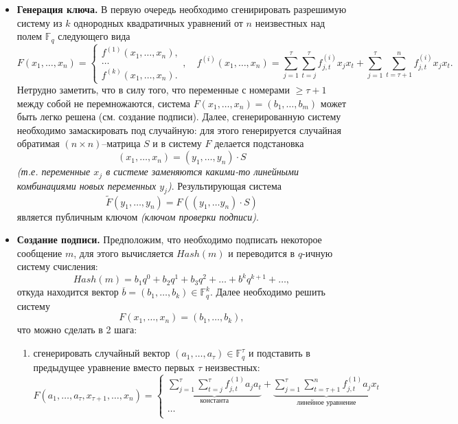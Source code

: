 \documentclass[12pt,letterpaper]{article}
\newcommand{\FF}{\mathds{F}}
\begin{document}
\begin{itemize}
  \item \textbf{Генерация ключа.} В первую очередь необходимо сгенирировать разрешимую систему из $k$ однородных квадратичных уравнений от $n$ неизвестных над полем $\FF_q$ следующего вида
  \[
    F(x_1, \dots, x_n) = \begin{cases}
      f^{(1)}(x_1, \dots, x_n), \\
      \dots \\
      f^{(k)}(x_1, \dots, x_n). 
    \end{cases}, \quad
    f^{(i)}(x_1, \dots, x_n) = \sum_{j = 1}^\tau \sum_{t = j}^\tau f^{(i)}_{j,t} x_j x_t + \sum_{j = 1}^\tau \sum_{t = \tau+1}^n f^{(i)}_{j,t} x_j x_t.
  \]
  Нетрудно заметить, что в силу того, что переменные с номерами $\geq \tau+1$ между собой не перемножаются, система $F(x_1, \dots, x_n) = (b_1, \dots, b_m)$ может быть  легко решена (см. создание подписи). Далее, сгенерированную систему необходимо замаскировать под случайную: для этого генерируется случайная обратимая $(n \times n)$--матрица $S$ и в систему $F$ делается подстановка
  \[ (x_1, \dots, x_n) = (y_1, \dots, y_n) \cdot S \]
  \emph{(т.е. переменные $x_j$ в системе заменяются какими-то линейными комбинациями новых переменных $y_j$)}. Результирующая система 
  \[ \tilde{F}(y_1, \dots, y_n) = F\left( (y_1, \dots y_n) \cdot S \right) \]
  является публичным ключом \emph{(ключом проверки подписи)}.
  \item \textbf{Создание подписи.} Предположим, что необходимо подписать некоторое сообщение $m$, для этого вычисляется $Hash(m)$ и переводится в $q$-ичную систему счисления:
  \[ Hash(m) = b_1 q^0 + b_2 q^1 + b_3 q^2 + \dots + b^k q^{k+1} + \dots, \]
  откуда находится вектор $\overline{b} = (b_1, \dots, b_k) \in \FF_q^k$. Далее необходимо решить систему
  \[ F(x_1, \dots, x_n) = (b_1, \dots, b_k), \]
  что можно сделать в 2 шага:
  \begin{enumerate}
    \item сгенерировать случайный вектор $(a_1, \dots, a_\tau) \in \FF_q^\tau$ и подставить в предыдущее уравнение вместо первых $\tau$ неизвестных:
    \[
      F(a_1, \dots, a_\tau, x_{\tau+1}, \dots, x_n) = 
      \begin{cases}
        \underbrace{\sum_{j = 1}^\tau \sum_{t = j}^\tau f^{(1)}_{j,t} a_j a_t }_{\text{константа}}  + \underbrace{\sum_{j = 1}^\tau \sum_{t = \tau+1}^n f^{(1)}_{j,t} a_j x_t}_{\text{линейное уравнение}} \\
        \dots \\

\end{cases}\]
\end{enumerate}
\end{itemize}
\end{document}
